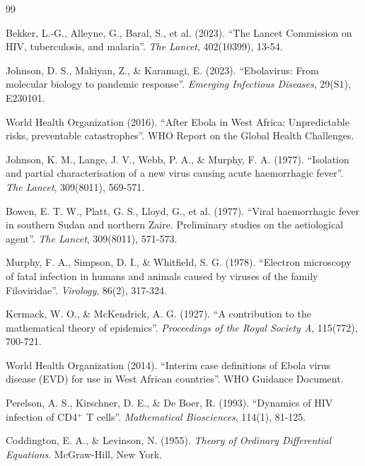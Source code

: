 ﻿\documentclass[a4paper,12pt]{article}
\theoremstyle{definition}
\begin{document}
\newpage


\begin{thebibliography}{99}

Bekker, L.-G., Alleyne, G., Baral, S., et al. (2023).
``The Lancet Commission on HIV, tuberculosis, and malaria''.
\textit{The Lancet}, 402(10399), 13-54.

Johnson, D. S., Makiyan, Z., \& Karamagi, E. (2023).
``Ebolavirus: From molecular biology to pandemic response''.
\textit{Emerging Infectious Diseases}, 29(S1), E230101.

World Health Organization (2016).
``After Ebola in West Africa: Unpredictable risks, preventable catastrophes''.
WHO Report on the Global Health Challenges.

Johnson, K. M., Lange, J. V., Webb, P. A., \& Murphy, F. A. (1977).
``Isolation and partial characterisation of a new virus causing acute haemorrhagic fever''.
\textit{The Lancet}, 309(8011), 569-571.

Bowen, E. T. W., Platt, G. S., Lloyd, G., et al. (1977).
``Viral haemorrhagic fever in southern Sudan and northern Zaire. Preliminary studies on the aetiological agent''.
\textit{The Lancet}, 309(8011), 571-573.

Murphy, F. A., Simpson, D. I., \& Whitfield, S. G. (1978).
``Electron microscopy of fatal infection in humans and animals caused by viruses of the family Filoviridae''.
\textit{Virology}, 86(2), 317-324.

Kermack, W. O., \& McKendrick, A. G. (1927).
``A contribution to the mathematical theory of epidemics''.
\textit{Proceedings of the Royal Society A}, 115(772), 700-721.

World Health Organization (2014).
``Interim case definitions of Ebola virus disease (EVD) for use in West African countries''.
WHO Guidance Document.

Perelson, A. S., Kirschner, D. E., \& De Boer, R. (1993).
``Dynamics of HIV infection of CD4$^+$ T cells''.
\textit{Mathematical Biosciences}, 114(1), 81-125.

Coddington, E. A., \& Levinson, N. (1955).
\textit{Theory of Ordinary Differential Equations}.
McGraw-Hill, New York.


\end{thebibliography}
\end{document}
